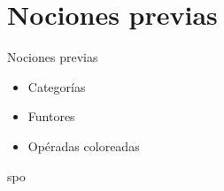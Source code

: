 \documentclass[12pt,aspectratio=169]{beamer}
\numberwithin{equation}{section}
\theoremstyle{definition}
\newtheorem{defi}[teo]{Definici\'on}
\begin{document}
{
\AtBeginSection{}
\section{Nociones previas}
\begin{frame}{Nociones previas}
    \begin{itemize}
        \item Categor\'ias
        \item Funtores
        \item Op\'eradas coloreadas
    \end{itemize}
    spo\end{frame}


}
\end{document}

